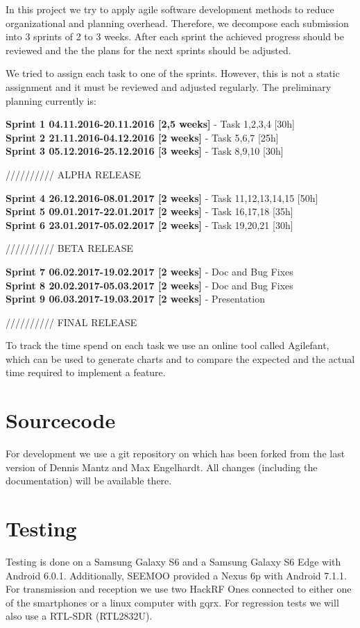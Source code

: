 In this project we try to apply agile software development methods to reduce organizational and planning overhead. Therefore, we decompose each submission into 3 sprints of 2 to 3 weeks. After each sprint the achieved progress should be reviewed and the the plans for the next sprints should be adjusted. 

We tried to assign each task to one of the sprints. However, this is not a static assignment and it must be reviewed and adjusted regularly. The preliminary planning currently is: 


\noindent\textbf{Sprint 1 04.11.2016-20.11.2016 [2,5 weeks]} 
- Task 1,2,3,4 [30h]\\
\textbf{Sprint 2 21.11.2016-04.12.2016 [2 weeks]}
- Task 5,6,7 [25h]\\
\textbf{Sprint 3 05.12.2016-25.12.2016 [3 weeks]}
- Task 8,9,10 [30h]

////////// ALPHA RELEASE

\noindent\textbf{Sprint 4 26.12.2016-08.01.2017 [2 weeks]}
- Task 11,12,13,14,15 [50h]\\
\textbf{Sprint 5 09.01.2017-22.01.2017 [2 weeks]}
- Task 16,17,18 [35h]\\
\textbf{Sprint 6 23.01.2017-05.02.2017 [2 weeks]}
- Task 19,20,21 [30h]


////////// BETA RELEASE

\noindent\textbf{Sprint 7 06.02.2017-19.02.2017 [2 weeks]}
- Doc and Bug Fixes\\
\textbf{Sprint 8 20.02.2017-05.03.2017 [2 weeks]}
- Doc and Bug Fixes\\
\textbf{Sprint 9 06.03.2017-19.03.2017 [2 weeks]}
- Presentation 

////////// FINAL RELEASE

To track the time spend on each task we use an online tool called Agilefant, which can be used to generate charts and to compare the expected and the actual time required to implement a feature. 

\section{Sourcecode}

For development we use a git repository on \cite{ANSIAN_GitHub} which has been forked from the last version of Dennis Mantz and Max Engelhardt. All changes (including the documentation) will be available there.

\section{Testing}

Testing is done on a Samsung Galaxy S6 and a Samsung Galaxy S6 Edge with Android 6.0.1. Additionally, \ac{SEEMOO} provided a Nexus 6p with Android 7.1.1. 
For transmission and reception we use two HackRF Ones connected to either one of the smartphones or a linux computer with gqrx. For regression tests we will also use a RTL-SDR (RTL2832U).

